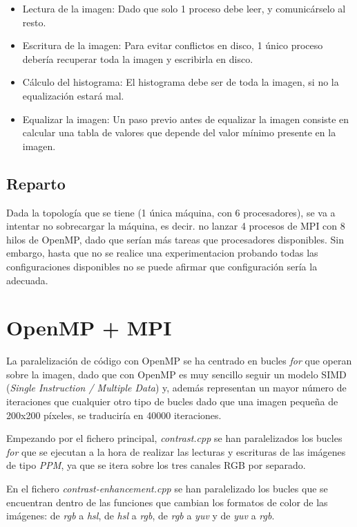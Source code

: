 \documentclass[12pt]{report} %
\begin{document}
\begin{itemize}
  \item Lectura de la imagen: Dado que solo 1 proceso debe leer, y comunicárselo al resto.
  \item Escritura de la imagen: Para evitar conflictos en disco, 1 único proceso debería recuperar toda la imagen y
      escribirla en disco.
  \item Cálculo del histograma: El histograma debe ser de toda la imagen, si no la equalización estará mal.
  \item Equalizar la imagen: Un paso previo antes de equalizar la imagen consiste en calcular una tabla de valores
      que depende del valor mínimo presente en la imagen.
\end{itemize}


\subsection{Reparto}

Dada la topología que se tiene (1 única máquina, con 6 procesadores), se va a intentar no sobrecargar la máquina,
es decir. no lanzar 4 procesos de MPI con 8 hilos de OpenMP, dado que serían más tareas que procesadores
disponibles. Sin embargo, hasta que no se realice una experimentacion probando todas las configuraciones
disponibles no se puede afirmar que configuración sería la adecuada.

\section{OpenMP + MPI}
\label{sec:OpenMP+MPI}

La paralelización de código con OpenMP se ha centrado en bucles \textit{for} que operan sobre la imagen,
dado que con OpenMP es muy sencillo seguir un modelo SIMD (\textit{Single Instruction / Multiple Data})
y, además representan un mayor número de iteraciones que cualquier otro tipo de bucles dado que una
imagen pequeña de 200x200 píxeles, se traduciría en 40000 iteraciones.

Empezando por el fichero principal, \textit{contrast.cpp} se han paralelizados los bucles
\textit{for} que se ejecutan a la hora de realizar las lecturas y escrituras de las imágenes de
tipo \textit{PPM}, ya que se itera sobre los tres canales RGB por separado.

En el fichero \textit{contrast-enhancement.cpp} se han paralelizado los bucles que
se encuentran dentro de las funciones que cambian los formatos de color de las imágenes: de \textit{rgb}
a \textit{hsl}, de \textit{hsl} a \textit{rgb}, de \textit{rgb} a \textit{yuv} y de \textit{yuv}
a \textit{rgb}.
\end{document}
